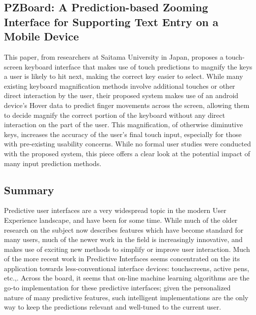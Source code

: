 \documentclass[format=acmsmall, nonacm, authorversion, screen]{acmart}
\begin{document}
\subsection{PZBoard: A Prediction-based Zooming Interface for Supporting Text Entry on a Mobile Device \citep{aiyoshizawa2016pzboard}}
This paper, from researchers at Saitama University in Japan, proposes a touch-screen keyboard interface that makes use of touch predictions to magnify the keys a user is likely to hit next, making the correct key easier to select. While many existing keyboard magnification methods involve additional touches or other direct interaction by the user, their proposed system makes use of an android device's Hover data to predict finger movements across the screen, allowing them to decide magnify the correct portion of the keyboard without any direct interaction on the part of the user. This magnification, of otherwise diminutive keys, increases the accuracy of the user's final touch input, especially for those with pre-existing usability concerns. While no formal user studies were conducted with the proposed system, this piece offers a clear look at the potential impact of many input prediction methods.

\subsection{Summary}
Predictive user interfaces are a very widespread topic in the modern User Experience landscape, and have been for some time. While much of the older research on the subject now describes features which have become standard for many users, much of the newer work in the field is increasingly innovative, and makes use of exciting new methods to simplify or improve user interaction. Much of the more recent work in Predictive Interfaces seems concentrated on the its application towards less-conventional interface devices: touchscreens, active pens, etc.,. Across the board, it seems that on-line machine learning algorithms are the go-to implementation for these predictive interfaces; given the personalized nature of many predictive features, such intelligent implementations are the only way to keep the predictions relevant and well-tuned to the current user. 
\end{document}
